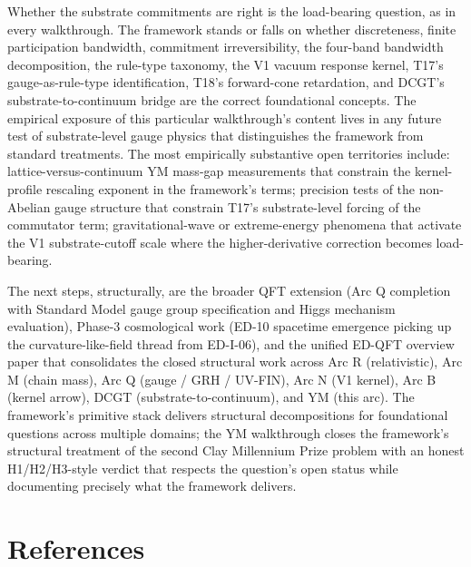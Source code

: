 \documentclass[11pt,a4paper]{article}
\begin{document}
Whether the substrate commitments are right is the load-bearing question, as in every walkthrough. The framework stands or falls on whether discreteness, finite participation bandwidth, commitment irreversibility, the four-band bandwidth decomposition, the rule-type taxonomy, the V1 vacuum response kernel, T17's gauge-as-rule-type identification, T18's forward-cone retardation, and DCGT's substrate-to-continuum bridge are the correct foundational concepts. The empirical exposure of this particular walkthrough's content lives in any future test of substrate-level gauge physics that distinguishes the framework from standard treatments. The most empirically substantive open territories include: lattice-versus-continuum YM mass-gap measurements that constrain the kernel-profile rescaling exponent in the framework's terms; precision tests of the non-Abelian gauge structure that constrain T17's substrate-level forcing of the commutator term; gravitational-wave or extreme-energy phenomena that activate the V1 substrate-cutoff scale where the higher-derivative correction becomes load-bearing.

The next steps, structurally, are the broader QFT extension (Arc Q completion with Standard Model gauge group specification and Higgs mechanism evaluation), Phase-3 cosmological work (ED-10 spacetime emergence picking up the curvature-like-field thread from ED-I-06), and the unified ED-QFT overview paper that consolidates the closed structural work across Arc R (relativistic), Arc M (chain mass), Arc Q (gauge / GRH / UV-FIN), Arc N (V1 kernel), Arc B (kernel arrow), DCGT (substrate-to-continuum), and YM (this arc). The framework's primitive stack delivers structural decompositions for foundational questions across multiple domains; the YM walkthrough closes the framework's structural treatment of the second Clay Millennium Prize problem with an honest H1/H2/H3-style verdict that respects the question's open status while documenting precisely what the framework delivers.

\section{References}
\end{document}
